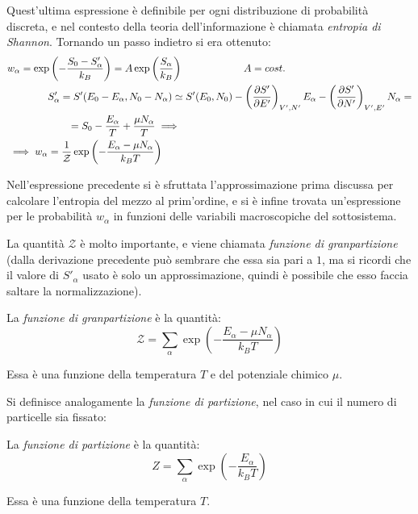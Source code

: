 Quest'ultima espressione è definibile per ogni distribuzione di probabilità discreta, e nel contesto della teoria dell'informazione è chiamata \textit{entropia di Shannon}.
Tornando un passo indietro si era ottenuto:
\begin{align*}
	&w_\alpha = \exp \left(- \frac{S_0 - S'_\alpha}{k_B}\right) = A \exp \left(\frac{S_\alpha}{k_B}\right) \qquad \qquad \qquad A = cost.\\
	&\qquad \qquad S'_\alpha = S'(E_0 - E_\alpha, N_0 - N_\alpha) \simeq S'(E_0, N_0) - \left(\frac{\partial {S'}}{\partial {E'}}\right)_{V',N'} E_\alpha - \left(\frac{\partial {S'}}{\partial {N'}}\right)_{V',E'} N_\alpha =\\
	&\qquad \qquad \qquad = S_0 - \frac{E_\alpha}{T} + \frac{\mu N_\alpha}{T} \implies\\
	&\implies w_\alpha = \frac{1}{\mathcal{Z}} \exp \left(- \frac{E_\alpha - \mu N_\alpha}{k_BT}\right)
\end{align*}

\noindent Nell'espressione precedente si è sfruttata l'approssimazione prima discussa per calcolare l'entropia del mezzo al prim'ordine, e si è infine trovata un'espressione per le probabilità $w_\alpha$ in funzioni delle variabili macroscopiche del sottosistema.

La quantità $\mathcal{Z}$ è molto importante, e viene chiamata \textit{funzione di granpartizione} (dalla derivazione precedente può sembrare che essa sia pari a $ 1 $, ma si ricordi che il valore di $ S'_\alpha $ usato è solo un approssimazione, quindi è possibile che esso faccia saltare la normalizzazione).

\begin{defn}
	La \textit{funzione di granpartizione} è la quantità:
	\begin{equation*}
	\mathcal{Z} = \sum_{\alpha} \exp \left(- \frac{E_\alpha - \mu N_\alpha}{k_BT}\right)
	\end{equation*}
	
	Essa è una funzione della temperatura $T$ e del potenziale chimico $\mu$.
\end{defn}

Si definisce analogamente la \textit{funzione di partizione}, nel caso in cui il numero di particelle sia fissato:

\begin{defn}
	La \textit{funzione di partizione} è la quantità:
	\begin{equation*}
	Z = \sum_{\alpha} \exp \left(- \frac{E_\alpha}{k_BT}\right)
	\end{equation*}
	
	Essa è una funzione della temperatura $T$.
\end{defn}

